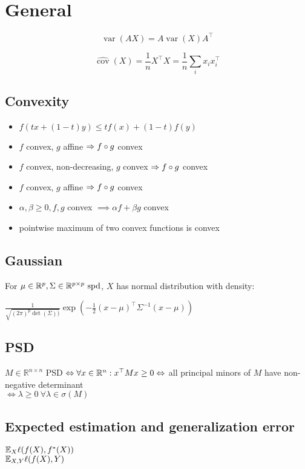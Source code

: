 \section*{General}

$$
\operatorname{var}(AX)=A\operatorname{var}(X)A^\top
$$


$$
\widehat{\operatorname{cov}}(X)=\frac{1}{n}X^\top X=\frac{1}{n}\sum_i x_ix_i^\top
$$

\subsection*{Convexity}
\begin{itemize}
    \item{$f(t x + (1-t)y) \leq t f(x) + (1-t) f(y)$}
    \item{$f$ convex, $g$ affine $\Rightarrow f\circ g$ convex}
    \item{$f$ convex, non-decreasing, $g$ convex $\Rightarrow f\circ g$ convex}
    \item{$f$ convex, $g$ affine $\Rightarrow f\circ g$ convex}
    \item{$\alpha, \beta \geq 0, f, g$ convex $\implies \alpha f + \beta g$ convex}
    \item pointwise maximum of two convex functions is convex
\end{itemize}

\subsection*{Gaussian}

For $\mu \in \mathbb{R}^p, \Sigma \in \mathbb{R}^{p \times p} \ \text{spd}$, $X$ has normal distribution with density:

$\frac{1}{\sqrt{(2\pi)^p \det(\Sigma))}}\exp({-\frac{1}{2}(x-\mu)^\top \Sigma^{-1}(x-\mu)})$

\subsection*{PSD}
$M \in \mathbb{R}^{n\times n}$ PSD $\Leftrightarrow \forall x \in \mathbb{R}^n: x^\top Mx \geq 0 \\
\Leftrightarrow$ all principal minors of $M$ have non-negative determinant\\
$\Leftrightarrow \lambda \geq 0 \ \forall \lambda\in\sigma(M)$

\subsection*{Expected estimation and generalization error}
$\mathbb{E}_{X}\ell(f(X), f^\ast(X))$ \\ 
$\mathbb{E}_{X,Y}\ell(f(X), Y)$

